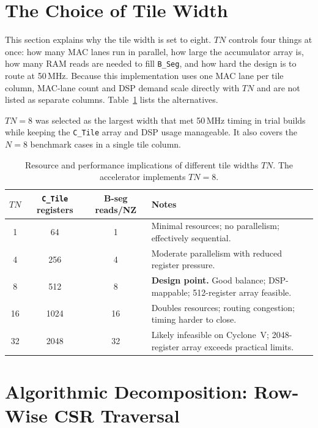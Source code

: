 \vspace{8cm}

\section{The Choice of Tile Width}
\label{sec:tn-choice}

This section explains why the tile width is set to eight. $TN$ controls four
things at once: how many MAC lanes run in parallel, how large the
accumulator array is, how many RAM reads are needed to fill
\texttt{B\_Seg}, and how hard the design is to route at 50\,MHz.
Because this implementation uses one MAC lane per tile column, MAC-lane
count and DSP demand scale directly with $TN$ and are not listed as
separate columns. Table~\ref{tab:tn-tradeoffs} lists the alternatives.

$TN = 8$ was selected as the largest width that met 50\,MHz timing in
trial builds while keeping the \texttt{C\_Tile} array and DSP usage
manageable. It also covers the $N = 8$ benchmark cases in a single tile
column.

\vspace{1cm}

\begin{table}[htbp]
  \centering
  \small
  \setlength{\tabcolsep}{4pt}
  \begin{tabular}{@{}ccc>{\raggedright\arraybackslash}p{7.0cm}@{}}
  \toprule
  $TN$ & \texttt{C\_Tile} registers & B-seg reads/NZ & Notes \\
  \midrule
  1  & 64   & 1  & Minimal resources; no parallelism; effectively sequential. \\[2pt]
  4  & 256  & 4  & Moderate parallelism with reduced register pressure. \\[2pt]
  8  & 512  & 8  & \textbf{Design point.} Good balance; DSP-mappable; 512-register array feasible. \\[2pt]
  16 & 1024 & 16 & Doubles resources; routing congestion; timing harder to close. \\[2pt]
  32 & 2048 & 32 & Likely infeasible on Cyclone~V; 2048-register array exceeds practical limits. \\
  \bottomrule
  \end{tabular}
  \caption{Resource and performance implications of different tile widths
           $TN$. The accelerator implements $TN = 8$.}
  \label{tab:tn-tradeoffs}
\end{table}

\section{Algorithmic Decomposition: Row-Wise CSR Traversal}

